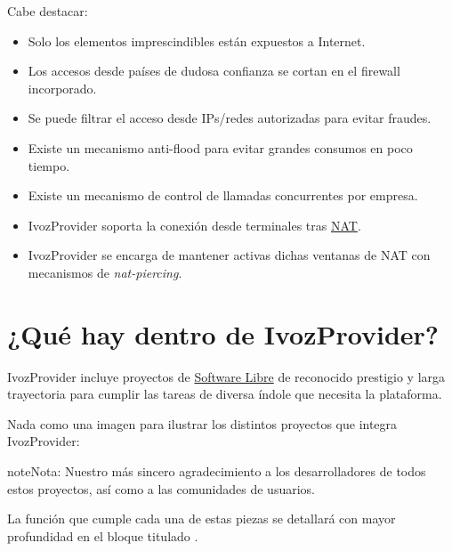 \documentclass[letterpaper,10pt,spanish]{sphinxmanual}
\begin{document}
Cabe destacar:
\begin{itemize}
\item {} 
Solo los elementos imprescindibles están expuestos a Internet.

\item {} 
Los accesos desde países de dudosa confianza se cortan en el firewall incorporado.

\item {} 
Se puede filtrar el acceso desde IPs/redes autorizadas para evitar fraudes.

\item {} 
Existe un mecanismo anti-flood para evitar grandes consumos en poco tiempo.

\item {} 
Existe un mecanismo de control de llamadas concurrentes por empresa.

\item {} 
IvozProvider soporta la conexión desde terminales tras \href{https://es.wikipedia.org/wiki/Traducci\%C3\%B3n\_de\_direcciones\_de\_red}{NAT}.

\item {} 
IvozProvider se encarga de mantener activas dichas ventanas de NAT con mecanismos de \emph{nat-piercing}.

\end{itemize}


\section{¿Qué hay dentro de IvozProvider?}
\label{intro/what_is_inside::doc}\label{intro/what_is_inside:what-is-inside-ivozprovider}
IvozProvider incluye proyectos de \href{https://www.gnu.org/philosophy/free-sw.es.html}{Software Libre} de reconocido prestigio y larga trayectoria para cumplir las tareas de diversa índole que necesita la plataforma.

Nada como una imagen para ilustrar los distintos proyectos que integra IvozProvider:


\begin{notice}{note}{Nota:}
Nuestro más sincero agradecimiento a los desarrolladores de todos estos proyectos, así como a las comunidades de usuarios.
\end{notice}

La función que cumple cada una de estas piezas se detallará con mayor profundidad en el bloque titulado {\hyperref[architecture/index:architecture]{}}.
\end{document}
